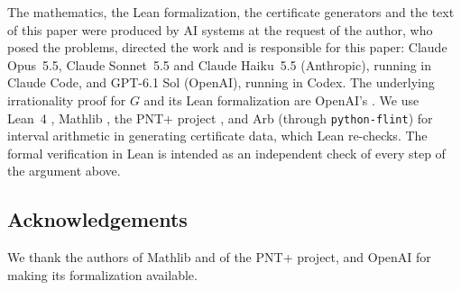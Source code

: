 \documentclass[11pt]{amsart}
\theoremstyle{definition}
\theoremstyle{remark}
\numberwithin{equation}{section}
\begin{document}
The mathematics, the Lean formalization, the certificate generators and the text of this paper were produced by AI systems at the request of the author, who posed the problems, directed the work and is responsible for this paper: Claude Opus~5.5, Claude Sonnet~5.5 and Claude Haiku~5.5 (Anthropic), running in Claude Code, and GPT-6.1 Sol (OpenAI), running in Codex. The underlying irrationality proof for $G$ and its Lean formalization are OpenAI's \cite{OpenAI2026}. We use Lean~4
\cite{Lean4}, Mathlib \cite{Mathlib}, the PNT+ project \cite{PNTPlus}, and Arb \cite{Arb} (through
\texttt{python-flint}) for interval arithmetic in generating certificate data, which Lean re-checks. The formal
verification in Lean is intended as an independent check of every step of the argument above.

\subsection*{Acknowledgements}
We thank the authors of Mathlib and of the PNT+ project, and OpenAI for making its formalization available.



\end{document}
